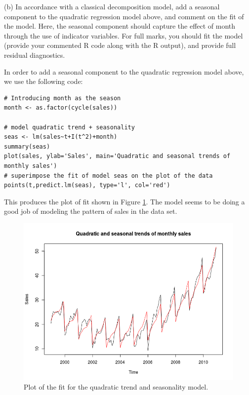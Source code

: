 \documentclass[]{article}
\begin{document}
\color{black}

(b) In accordance with a classical decomposition model, add a seasonal component to the quadratic regression model above, and comment on the fit of the model. Here, the seasonal component should capture the effect of month through the use of indicator variables. For full marks, you should fit the model (provide your commented R code along with the R output), and provide full residual diagnostics.

\color{blue}
In order to add a seasonal component to the quadratic regression model above, we use the following code:

\begin{Verbatim}[frame=single]
# Introducing month as the season
month <- as.factor(cycle(sales)) 

# model quadratic trend + seasonality
seas <- lm(sales~t+I(t^2)+month) 
summary(seas)
plot(sales, ylab='Sales', main='Quadratic and seasonal trends of monthly sales')
# superimpose the fit of model seas on the plot of the data
points(t,predict.lm(seas), type='l', col='red')
\end{Verbatim}

This produces the plot of fit shown in Figure \ref{seas}. The model seems to be doing a good job of modeling the pattern of sales in the data set.

\begin{figure}[!ht]
\centering
\includegraphics[width=\textwidth]{seas.png}
\caption{Plot of the fit for the quadratic trend and seasonality model.}
\label{seas}
\end{figure}
\end{document}
